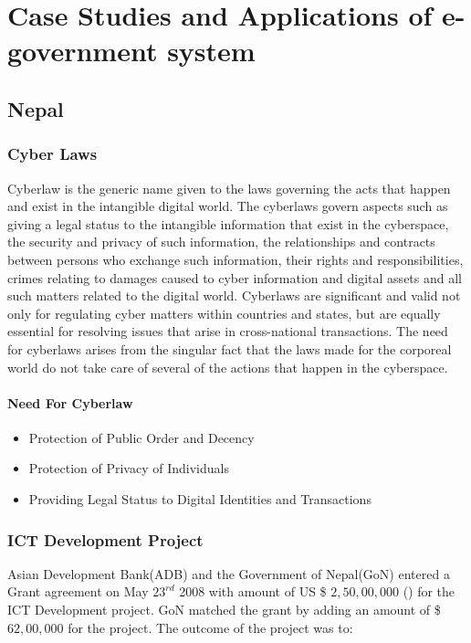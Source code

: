 \chapter{Case Studies and Applications of e-government system}

\section{Nepal}
\subsection{Cyber Laws}
Cyberlaw is the generic name given to the laws governing the acts that happen and exist in the intangible digital world. The cyberlaws govern aspects such as giving a legal status to the intangible information that exist in the cyberspace, the security and privacy of such information, the relationships and contracts between persons who exchange such information, their rights and responsibilities, crimes relating to damages caused to cyber information and digital assets and all such matters related to the digital world. Cyberlaws are significant and valid not only for regulating cyber matters within countries and states, but are equally essential for resolving issues that arise in cross-national transactions. The need for cyberlaws arises from the singular fact that the laws made for the corporeal world do not take care of several of the actions that happen in the cyberspace.

\subsubsection{Need For Cyberlaw}
\begin{itemize}
	\item Protection of Public Order and Decency
	\item Protection of Privacy of Individuals
	\item Providing Legal Status to Digital Identities and Transactions
\end{itemize}

\subsection{ICT Development Project}

Asian Development Bank(ADB) and the Government of Nepal(GoN) entered a Grant agreement on May $23^{rd}$ 2008 with amount of US \$ $ 2,50,00,000 $ () for the ICT Development project. GoN matched the grant by adding an amount of \$ $ 62,00,000 $ for the project. The outcome of the project was to:

